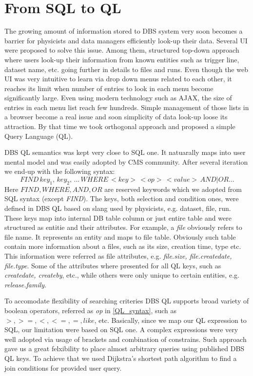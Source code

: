 \documentclass[a4paper]{jpconf}
\begin{document}
\section{From SQL to QL}
The growing amount of information stored to DBS system very soon
becomes a barrier for physicists and data managers efficiently
look-up their data. Several UI were proposed to solve this issue.
Among them, structured top-down approach where users look-up their
information from known entities such as trigger line, dataset name, etc.
going further in details to files and runs. Even though the web UI
was very intuitive to learn via drop down menus related to each
other, it reaches its limit when number of entries to look in each menu
become significantly large. Even using modern technology such as
AJAX, the size of entries in each menu list reach few hundreds.
Simple management of those lists in a browser become a real issue and
soon simplicity of data look-up loose its attraction. By that time
we took orthogonal approach and proposed a simple Query Language (QL).

DBS QL semantics was kept very close to SQL one. It natuarally
maps into user mental model and was easily adopted by CMS
community. After several iteration we end-up with the following syntax:
\[
FIND\,
key_1,\, key_2,\, ...\, WHERE\,
<key>\, <op>\, <value>\, AND|OR ...
\label{QL_syntax}
\]
Here $FIND, WHERE, AND, OR$ are reserved keywords
which we adopted from SQL syntax (except {\it FIND}). The keys,
both selection and condition ones, were defined
in DBS QL based on slang used by physicists, e.g. dataset, file, run. 
These keys map into internal DB table column or just entire table and 
were structured as entitie and their attributes. For example,
a {\it file} obviously refers to file name. It represents an
entity and maps to file table. Obviously such table
contain more information about a files, such as its size, creation time,
type etc. This information were referred as file attributes, e.g.
{\it file.size, file.createdate, file.type}. Some of the attributes
where presented for all QL keys, such as {\it createdate, createby}, etc.,
while others were only unique to certain entities, e.g. {\it release.family}.

To accomodate flexibility of searching criteries DBS QL supports
broad variety of boolean operators, referred as {\it op} in
\ref{QL_syntax}, such as $>, >=, <, <=, =, like$, etc.  Basically,
since we map our QL expression to SQL, our limitation were based
on SQL one. A complex expressions were very well adopted via
usage of brackets and combination of constrains.
Such approach gave us a great felxibility to place almost
arbitrary queries using published DBS QL keys. To achieve that
we used Dijkstra’s shortest path algorithm to find a join conditions
for provided user query.
\end{document}
